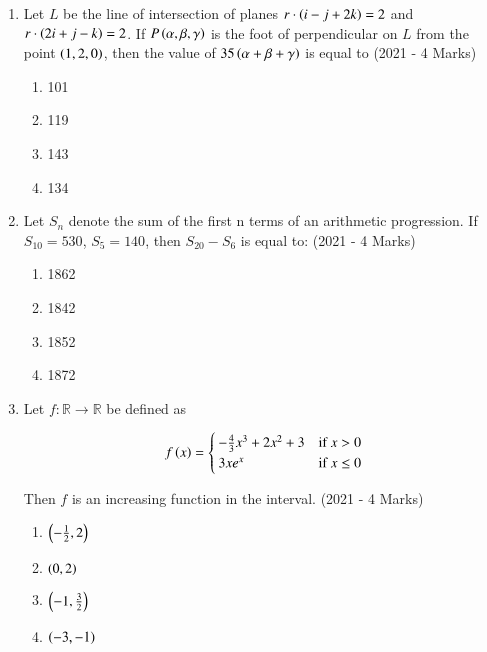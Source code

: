 \documentclass[journal]{IEEEtran}
\begin{document}
    \begin{enumerate}
    \item{
          	Let $L$ be the line of intersection of planes $r \cdot \left(i - j + 2k\right) = 2$ and $r \cdot \left(2i + j - k\right) = 2$. If $P\left(\alpha, \beta, \gamma\right)$ is the foot of perpendicular on $L$ from the point $\left(1, 2, 0\right)$, then the value of $35\left(\alpha + \beta + \gamma\right)$ is equal to \text{  }\hfill
                {(2021 - 4 Marks)}
                \begin{multicols}{4}
					\begin{enumerate}
						\item 101
						\item 119
						\item 143
						\item 134
					\end{enumerate}
				\end{multicols}
            }
    \item{
           	Let $S_n$ denote the sum of the first n terms of an arithmetic progression. If $S_{10} = 530$, $S_5 = 140$, then 
           	$S_{20} - S_6$ is equal to:
           	\hfill
           	{(2021 - 4 Marks)}
                \begin{multicols}{4}
                	\begin{enumerate}
                		\item 1862
                		\item 1842
                		\item 1852
                		\item 1872
                	\end{enumerate}
                \end{multicols}
        }
\item{
        	
        	Let $f : \mathbb{R} \rightarrow \mathbb{R}$ be defined as
        	
        	\[ f\left(x\right) = \begin{cases} 
        		-\frac{4}{3}x^3 + 2x^2 + 3 & \text{if } x > 0 \\
        		3xe^x & \text{if } x \leq 0 
        	\end{cases} \]
        	
        	Then $f$ is an increasing function in the interval.
        	\hfill
        	{(2021 - 4 Marks)}
        	\begin{multicols}{4}
        		\begin{enumerate}
        			\item $\left(-\frac{1}{2}, 2\right)$
        			\item $\left(0,2\right)$
        			\item $\left(-1,\frac{3}{2}\right)$
        			\item $\left(-3,-1\right)$
        		\end{enumerate}
        	\end{multicols}
        	
}
\end{enumerate}
\end{document}
